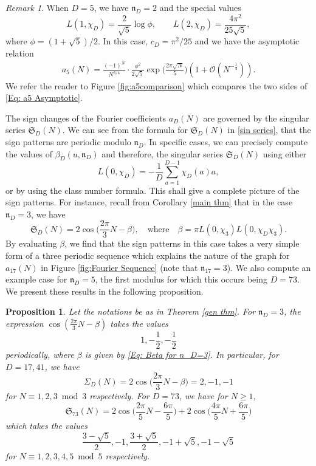 \documentclass[11pt]{amsart}
\numberwithin{equation}{section}
\newcommand{\mf}{\mathfrak}
\newcommand{\n}{\mf{n}_D}
\newtheorem{prop}[thm]{Proposition}
\theoremstyle{remark}
\newtheorem{rem}[thm]{Remark}
\begin{document}
\begin{rem}
When $D=5$, we have $\mf{n}_D=2$ and the special values 
\[
L(1,\chi_D)=\frac{2}{\sqrt{5}}\log \phi,\qquad L(2,\chi_D)=\frac{4\pi^2}{25\sqrt{5}},
\]
where $\phi=(1+\sqrt{5})/2$. In this case, $c_D=\pi^2/25$ and we have the asymptotic relation
\begin{align}\label{Eq: a5 Asymptotic}
a_5(N)=\frac{(-1)^N}{N^{3/4}} \cdot \frac{\phi^2}{2\sqrt{5}}\exp\bigg(\frac{2\pi\sqrt{N}}{5}\bigg) (1+\mathcal{O}(N^{-\frac14})).
\end{align}
We refer the reader to Figure \ref{fig:a5comparison} which compares the two sides of \eqref{Eq: a5 Asymptotic}.
\end{rem}
The sign changes of the Fourier coefficients $a_D(N)$ are governed by the singular series $\mf{S}_D(N)$. We can see from the formula for $\mf{S}_D(N)$ in \eqref{sin series}, that the sign patterns are periodic modulo $\n$. In specific cases, we can precisely compute the values of $\beta_D(u,\mf{n}_D)$ and therefore, the singular series $\mf{S}_D(N)$ using either
\[
L(0,\chi_D)=-\frac{1}{D}\sum_{a=1}^{D-1} \chi_D(a)a,
\] 
or by using the class number formula. This shall give a complete picture of the sign patterns. For instance, recall from Corollary \ref{main thm} that in the case $\n=3$, we have
\[
\mf{S}_{D}(N) = 2 \cos\bigg(\frac{2\pi}{3}N-\beta\bigg), \quad \textrm{where} \quad \beta = \pi L(0,\chi_3)L(0,\chi_D\chi_3).
\]
By evaluating $\beta$, we find that the sign patterns in this case takes a very simple form of a three periodic sequence which explains the nature of the graph for $a_{17}(N)$ in Figure \ref{fig:Fourier Sequence} (note that $\mf{n}_{17} =3$). We also compute an example case for $\n=5$, the first modulus for which this occurs being $D=73$. We present these results in the following proposition.
\begin{prop}\label{n3 prop}
Let the notations be as in Theorem \ref{gen thm}. For $\mf{n}_D=3$, the expression $\cos(\tfrac{2\pi}{3}N-\beta)$ takes the values 
\[
1,-\frac12,-\frac12
\]
periodically, where $\beta$ is given by \eqref{Eq: Beta for n_D=3}. In particular, for $D=17, 41$, we have
\[
\Sigma_D(N) = 2 \cos\bigg(\frac{2\pi}{3}N-\beta\bigg)=2,-1,-1
\]
for $N\equiv 1,2,3\bmod 3$ respectively. For $D=73$, we have for $N \geq 1$, 
\[
\mf{S}_{73}(N)
=
2\cos\bigg(\frac{2\pi}{5}N-\frac{6\pi}{5}\bigg)+2\cos\bigg(\frac{4\pi}{5}N+\frac{6\pi}{5}\bigg)
\]
which takes the values
\[
\frac{3-\sqrt{5}}{2}, -1, \frac{3+\sqrt{5}}{2}, -1+\sqrt{5}, -1-\sqrt{5}
\]
for $N\equiv 1,2,3,4,5 \bmod 5$ respectively. 
\end{prop}  
\end{document}
